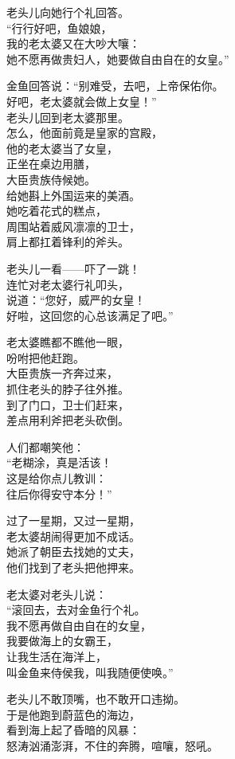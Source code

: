 \documentclass[
]{book}
\renewenvironment{quote}{\begin{VF}}{\end{VF}}
\begin{document}
\begin{quote}
老头儿向她行个礼回答。\\
``行行好吧，鱼娘娘，\\
我的老太婆又在大吵大嚷：\\
她不愿再做贵妇人，她要做自由自在的女皇。''

金鱼回答说：``别难受，去吧，上帝保佑你。\\
好吧，老太婆就会做上女皇！''\\
老头儿回到老太婆那里。\\
怎么，他面前竟是皇家的宫殿，\\
他的老太婆当了女皇，\\
正坐在桌边用膳，\\
大臣贵族侍候她。\\
给她斟上外国运来的美酒。\\
她吃着花式的糕点，\\
周围站着威风凛凛的卫士，\\
肩上都扛着锋利的斧头。

老头儿一看------吓了一跳！\\
连忙对老太婆行礼叩头，\\
说道：``您好，威严的女皇！\\
好啦，这回您的心总该满足了吧。''

老太婆瞧都不瞧他一眼，\\
吩咐把他赶跑。\\
大臣贵族一齐奔过来，\\
抓住老头的脖子往外推。\\
到了门口，卫士们赶来，\\
差点用利斧把老头砍倒。

人们都嘲笑他：\\
``老糊涂，真是活该！\\
这是给你点儿教训：\\
往后你得安守本分！''

过了一星期，又过一星期，\\
老太婆胡闹得更加不成话。\\
她派了朝臣去找她的丈夫，\\
他们找到了老头把他押来。

老太婆对老头儿说：\\
``滚回去，去对金鱼行个礼。\\
我不愿再做自由自在的女皇，\\
我要做海上的女霸王，\\
让我生活在海洋上，\\
叫金鱼来侍侯我，叫我随便使唤。''

老头儿不敢顶嘴，也不敢开口违拗。\\
于是他跑到蔚蓝色的海边，\\
看到海上起了昏暗的风暴：\\
怒涛汹涌澎湃，不住的奔腾，喧嚷，怒吼。


\end{quote}
\end{document}
